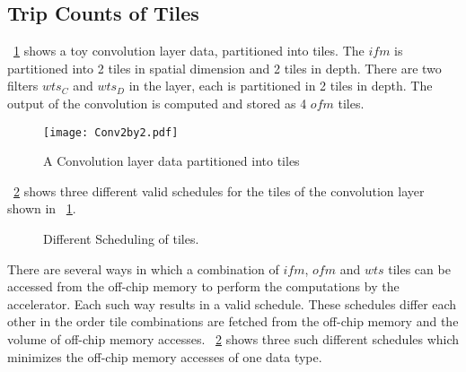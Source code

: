 \subsection{Trip Counts of Tiles}\label{sec:TripCount}
\figurename~\ref{fig:convPartitionedLayer} shows a toy convolution layer data, partitioned into tiles. The $ifm$ is partitioned into 2 tiles in spatial dimension and 2 tiles in depth. There are two filters $wts_C$ and $wts_D$ in the layer, each is partitioned in 2 tiles in depth. The output of the convolution is computed and stored as 4 $ofm$ tiles.
\begin{figure}[!htb]
	\centering
	\captionsetup{font=sf}	
	\texttt{[image: Conv2by2.pdf]}
	\caption{A Convolution layer data partitioned into tiles }
	\label{fig:convPartitionedLayer}
\end{figure}
\figurename~\ref{fig:differentScheduling} shows three different valid schedules for the tiles of the convolution layer shown in \figurename~\ref{fig:convPartitionedLayer}. 
\begin{figure}[!htb]
	\centering
	\captionsetup{font=sf}
    \hfil		
	\hfil	
	\hfil	
	\caption{Different Scheduling of tiles.}
	\label{fig:differentScheduling}
\end{figure}

There are several ways in which  a  combination of $ifm$, $ofm$ and $wts$ tiles can be accessed from the off-chip memory to perform the computations by the accelerator. Each such way results in a valid schedule. These schedules differ each other in the order tile combinations are fetched from the off-chip memory and the volume of off-chip memory accesses. \figurename~\ref{fig:differentScheduling} shows three such different schedules which minimizes the off-chip memory accesses of one data type.

